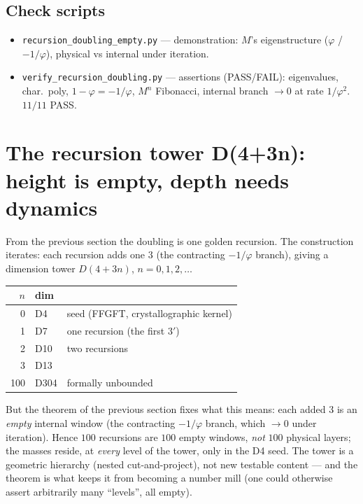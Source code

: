 \subsection{Check scripts}
\begin{itemize}
\item \texttt{recursion\_doubling\_empty.py} --- demonstration: $M$'s eigenstructure
($\varphi$ / $-1/\varphi$), physical vs internal under iteration.
\item \texttt{verify\_recursion\_doubling.py} --- assertions (PASS/FAIL): eigenvalues, char.\
poly, $1-\varphi=-1/\varphi$, $M^n$ Fibonacci, internal branch $\to0$ at rate $1/\varphi^2$.
$11/11$ PASS.
\end{itemize}

\section{The recursion tower D(4+3n): height is empty, depth needs dynamics}
From the previous section the doubling is one golden recursion. The construction iterates: each
recursion adds one $3$ (the contracting $-1/\varphi$ branch), giving a dimension tower
$D(4+3n)$, $n=0,1,2,\dots$
\begin{center}\small\renewcommand{\arraystretch}{1.15}
\begin{tabular}{@{}r l l@{}}
\toprule
$n$ & dim & \\
\midrule
0 & D4 & seed (FFGFT, crystallographic kernel) \\
1 & D7 & one recursion (the first $3'$) \\
2 & D10 & two recursions \\
3 & D13 & \\
100 & D304 & formally unbounded \\
\bottomrule
\end{tabular}
\end{center}
\noindent But the theorem of the previous section fixes what this means: each added $3$ is an
\emph{empty} internal window (the contracting $-1/\varphi$ branch, which $\to0$ under iteration).
Hence $100$ recursions are $100$ empty windows, \emph{not} $100$ physical layers; the masses
reside, at \emph{every} level of the tower, only in the D4 seed. The tower is a geometric
hierarchy (nested cut-and-project), not new testable content --- and the theorem is what keeps
it from becoming a number mill (one could otherwise assert arbitrarily many \enquote{levels},
all empty).

